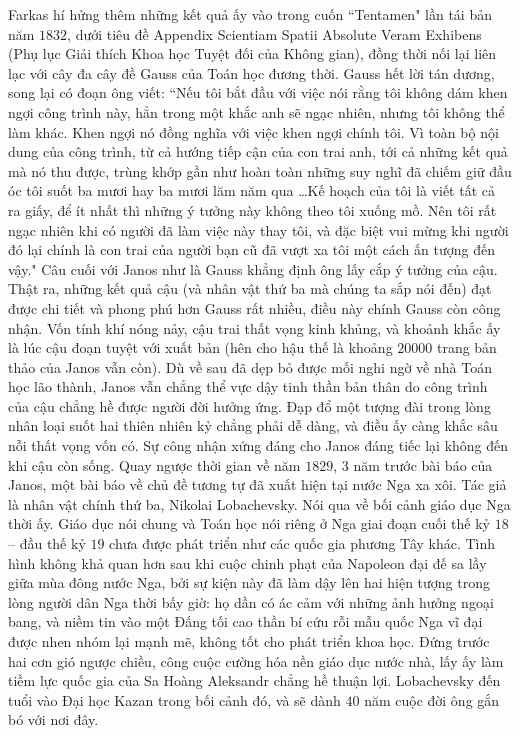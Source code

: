 \begin{multicols}{2}
	\vskip 0.1cm
	Farkas hí hửng thêm những kết quả ấy vào trong cuốn ``Tentamen" lần tái bản năm $1832$, dưới tiêu đề Appendix Scientiam Spatii Absolute Veram Exhibens (Phụ lục Giải thích Khoa học Tuyệt đối của Không gian), đồng thời nối lại liên lạc với cây đa cây đề Gauss của Toán học đương thời. Gauss hết lời tán dương, song lại có đoạn ông viết:
	\vskip 0.1cm
	``Nếu tôi bắt đầu với việc nói rằng tôi không dám khen ngợi công trình này, hẳn trong một khắc anh sẽ ngạc nhiên, nhưng tôi không thể làm khác. Khen ngợi nó đồng nghĩa với việc khen ngợi chính tôi. Vì toàn bộ nội dung của công trình, từ cả hướng tiếp cận của con trai anh, tới cả những kết quả mà nó thu được, trùng khớp gần như hoàn toàn những suy nghĩ đã chiếm giữ đầu óc tôi suốt ba mươi hay ba mươi lăm năm qua \ldots Kế hoạch của tôi là viết tất cả ra giấy, để ít nhất thì những ý tưởng này không theo tôi xuống mồ. Nên tôi rất ngạc nhiên khi có người đã làm việc này thay tôi, và đặc biệt vui mừng khi người đó lại chính là con trai của người bạn cũ đã vượt xa tôi một cách ấn tượng đến vậy."
	\vskip 0.1cm
	Câu cuối với Janos như là Gauss khẳng định ông lấy cắp ý tưởng của cậu. Thật ra, những kết quả cậu (và nhân vật thứ ba mà chúng ta sắp nói đến) đạt được chi tiết và phong phú hơn Gauss rất nhiều, điều này chính Gauss còn công nhận. Vốn tính khí nóng nảy, cậu trai thất vọng kinh khủng, và khoảnh khắc ấy là lúc cậu đoạn tuyệt với xuất bản (hên cho hậu thế là khoảng $20000$ trang bản thảo của Janos vẫn còn). Dù về sau đã dẹp bỏ được mối nghi ngờ về nhà Toán học lão thành, Janos vẫn chẳng thể vực dậy tinh thần bản thân do công trình của cậu chẳng hề được người đời hưởng ứng. Đạp đổ một tượng đài trong lòng nhân loại suốt hai thiên nhiên kỷ chẳng phải dễ dàng, và điều ấy càng khắc sâu nỗi thất vọng vốn có. Sự công nhận xứng đáng cho Janos đáng tiếc lại không đến khi cậu còn sống.
	\vskip 0.1cm
	Quay ngược thời gian về năm $1829$, $3$ năm trước bài báo của Janos, một bài báo về chủ đề tương tự đã xuất hiện tại nước Nga xa xôi. Tác giả là nhân vật chính thứ ba, Nikolai Lobachevsky. 
	\vskip 0.1cm
	Nói qua về bối cảnh giáo dục Nga thời ấy. Giáo dục nói chung và Toán học nói riêng ở Nga giai đoạn cuối thế kỷ $18$ -- đầu thế kỷ $19$ chưa được phát triển như các quốc gia phương Tây khác. Tình hình không khả quan hơn sau khi cuộc chinh phạt của Napoleon đại đế sa lầy giữa mùa đông nước Nga, bởi sự kiện này đã làm dậy lên hai hiện tượng trong lòng người dân Nga thời bấy giờ: họ dần có ác cảm với những ảnh hưởng ngoại bang, và niềm tin vào một Đấng tối cao thần bí cứu rỗi mẫu quốc Nga vĩ đại được nhen nhóm lại mạnh mẽ, không tốt cho phát triển khoa học. Đứng trước hai cơn gió ngược chiều, công cuộc cường hóa nền giáo dục nước nhà, lấy ấy làm tiềm lực quốc gia của Sa Hoàng Aleksandr chẳng hề thuận lợi. Lobachevsky đến tuổi vào Đại học Kazan trong bối cảnh đó, và sẽ dành $40$ năm cuộc đời ông gắn bó với nơi đây.

\end{multicols}
